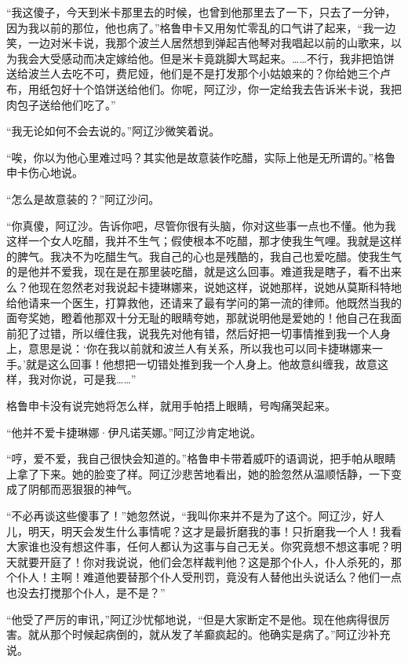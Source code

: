 \par “我这傻子，今天到米卡那里去的时候，也曾到他那里去了一下，只去了一分钟，因为我以前的那位，他也病了。”格鲁申卡又用匆忙零乱的口气讲了起来，“我一边笑，一边对米卡说，我那个波兰人居然想到弹起吉他琴对我唱起以前的山歌来，以为我会大受感动而决定嫁给他。但是米卡竟跳脚大骂起来。……不行，我非把馅饼送给波兰人去吃不可，费尼娅，他们是不是打发那个小姑娘来的？你给她三个卢布，用纸包好十个馅饼送给他们。你呢，阿辽沙，你一定给我去告诉米卡说，我把肉包子送给他们吃了。”
\par “我无论如何不会去说的。”阿辽沙微笑着说。
\par “唉，你以为他心里难过吗？其实他是故意装作吃醋，实际上他是无所谓的。”格鲁申卡伤心地说。
\par “怎么是故意装的？”阿辽沙问。
\par “你真傻，阿辽沙。告诉你吧，尽管你很有头脑，你对这些事一点也不懂。他为我这样一个女人吃醋，我并不生气；假使根本不吃醋，那才使我生气哩。我就是这样的脾气。我决不为吃醋生气。我自己的心也是残酷的，我自己也爱吃醋。使我生气的是他并不爱我，现在是在那里装吃醋，就是这么回事。难道我是瞎子，看不出来么？他现在忽然老对我说起卡捷琳娜来，说她这样，说她那样，说她从莫斯科特地给他请来一个医生，打算救他，还请来了最有学问的第一流的律师。他既然当我的面夸奖她，瞪着他那双十分无耻的眼睛夸她，那就说明他是爱她的！他自己在我面前犯了过错，所以缠住我，说我先对他有错，然后好把一切事情推到我一个人身上，意思是说：‘你在我以前就和波兰人有关系，所以我也可以同卡捷琳娜来一手。’就是这么回事！他想把一切错处推到我一个人身上。他故意纠缠我，故意这样，我对你说，可是我……”
\par 格鲁申卡没有说完她将怎么样，就用手帕捂上眼睛，号啕痛哭起来。
\par “他并不爱卡捷琳娜·伊凡诺芙娜。”阿辽沙肯定地说。
\par “哼，爱不爱，我自己很快会知道的。”格鲁申卡带着威吓的语调说，把手帕从眼睛上拿了下来。她的脸变了样。阿辽沙悲苦地看出，她的脸忽然从温顺恬静，一下变成了阴郁而恶狠狠的神气。
\par “不必再谈这些傻事了！”她忽然说，“我叫你来并不是为了这个。阿辽沙，好人儿，明天，明天会发生什么事情呢？这才是最折磨我的事！只折磨我一个人！我看大家谁也没有想这件事，任何人都认为这事与自己无关。你究竟想不想这事呢？明天就要开庭了！你对我说说，他们会怎样裁判他？这是那个仆人，仆人杀死的，那个仆人！主啊！难道他要替那个仆人受刑罚，竟没有人替他出头说话么？他们一点也没去打搅那个仆人，是不是？”
\par “他受了严厉的审讯，”阿辽沙忧郁地说，“但是大家断定不是他。现在他病得很厉害。就从那个时候起病倒的，就从发了羊癫疯起的。他确实是病了。”阿辽沙补充说。
